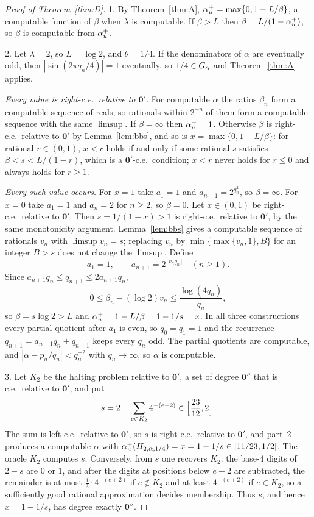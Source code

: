 \begin{proof}[Proof of Theorem~\ref{thm:D}]
1. By Theorem~\ref{thm:A}, $\alpha_u^+=\max\{0,1-L/\beta\}$, a computable function of $\beta$ when $\lambda$ is computable. If $\beta>L$ then $\beta=L/(1-\alpha_u^+)$, so $\beta$ is computable from $\alpha_u^+$.

2. Let $\lambda=2$, so $L=\log2$, and $\theta=1/4$. If the denominators of $\alpha$ are eventually odd, then $|\sin(2\pi q_n/4)|=1$ eventually, so $1/4\in G_\alpha$ and Theorem~\ref{thm:A} applies.

\emph{Every value is right-c.e.\ relative to $\mathbf 0'$.} For computable $\alpha$ the ratios $\beta_n$ form a computable sequence of reals, so rationals within $2^{-n}$ of them form a computable sequence with the same $\limsup$. If $\beta=\infty$ then $\alpha_u^+=1$. Otherwise $\beta$ is right-c.e.\ relative to $\mathbf 0'$ by Lemma~\ref{lem:bbs}, and so is $x=\max\{0,1-L/\beta\}$: for rational $r\in(0,1)$, $x<r$ holds if and only if some rational $s$ satisfies $\beta<s<L/(1-r)$, which is a $\mathbf 0'$-c.e.\ condition; $x<r$ never holds for $r\le0$ and always holds for $r\ge1$.

\emph{Every such value occurs.} For $x=1$ take $a_1=1$ and $a_{n+1}=2^{q_n^2}$, so $\beta=\infty$. For $x=0$ take $a_1=1$ and $a_n=2$ for $n\ge2$, so $\beta=0$. Let $x\in(0,1)$ be right-c.e.\ relative to $\mathbf 0'$. Then $s=1/(1-x)>1$ is right-c.e.\ relative to $\mathbf 0'$, by the same monotonicity argument. Lemma~\ref{lem:bbs} gives a computable sequence of rationals $v_n$ with $\limsup v_n=s$; replacing $v_n$ by $\min\{\max\{v_n,1\},B\}$ for an integer $B>s$ does not change the $\limsup$. Define
\[
a_1=1,\qquad a_{n+1}=2^{\lceil v_nq_n\rceil}\quad(n\ge1).
\]
Since $a_{n+1}q_n\le q_{n+1}\le2a_{n+1}q_n$,
\[
0\le\beta_n-(\log2)v_n\le\frac{\log(4q_n)}{q_n},
\]
so $\beta=s\log2>L$ and $\alpha_u^+=1-L/\beta=1-1/s=x$. In all three constructions every partial quotient after $a_1$ is even, so $q_0=q_1=1$ and the recurrence $q_{n+1}=a_{n+1}q_n+q_{n-1}$ keeps every $q_n$ odd. The partial quotients are computable, and $|\alpha-p_n/q_n|<q_n^{-2}$ with $q_n\to\infty$, so $\alpha$ is computable.

3. Let $K_2$ be the halting problem relative to $\mathbf 0'$, a set of degree $\mathbf 0''$ that is c.e.\ relative to $\mathbf 0'$, and put
\[
s=2-\sum_{e\in K_2}4^{-(e+2)}\in\Bigl[\frac{23}{12},2\Bigr].
\]
The sum is left-c.e.\ relative to $\mathbf 0'$, so $s$ is right-c.e.\ relative to $\mathbf 0'$, and part~2 produces a computable $\alpha$ with $\alpha_u^+(H_{2,\alpha,1/4})=x=1-1/s\in[11/23,1/2]$. The oracle $K_2$ computes $s$. Conversely, from $s$ one recovers $K_2$: the base-$4$ digits of $2-s$ are $0$ or $1$, and after the digits at positions below $e+2$ are subtracted, the remainder is at most $\frac13\cdot4^{-(e+2)}$ if $e\notin K_2$ and at least $4^{-(e+2)}$ if $e\in K_2$, so a sufficiently good rational approximation decides membership. Thus $s$, and hence $x=1-1/s$, has degree exactly $\mathbf 0''$.
\end{proof}

